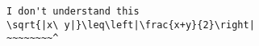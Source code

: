 \begin{verbatim}
I don't understand this
\sqrt{|x\ y|}\leq\left|\frac{x+y}{2}\right|
~~~~~~~~^
\end{verbatim}
